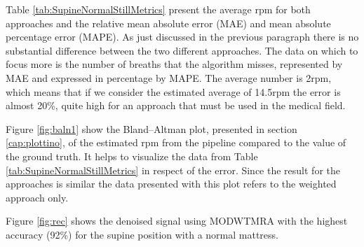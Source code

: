 Table \ref{tab:SupineNormalStillMetrics} present the average rpm for both approaches  
and the relative mean absolute error (MAE) and mean absolute percentage error (MAPE). As just discussed in the previous paragraph there is no substantial difference between the two different approaches. The data on which to focus more is the number of breaths that the algorithm misses, represented by MAE and expressed in percentage by MAPE. The average number is 2rpm, which means that if we consider the estimated average of 14.5rpm the error is almost 20\%, quite high for an approach that must be used in the medical field.



Figure \ref{fig:baln1} show the Bland–Altman plot, presented in section \ref{cap:plottino}, of the estimated rpm from the pipeline compared to the value of the ground truth. It helps to visualize the data from Table \ref{tab:SupineNormalStillMetrics} in respect of the error. Since the result for the approaches is similar the data presented with this plot refers to the weighted approach only.

Figure \ref{fig:rec} shows the denoised signal using MODWTMRA with the highest accuracy (92\%) for the supine position with a normal mattress.

